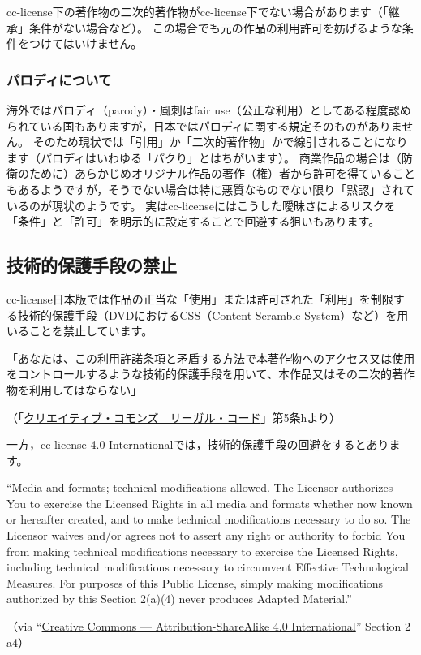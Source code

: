 \documentclass{ltjsarticle}
\renewcommand{\emph}[1]{\textsf{\textgt{#1}}} %
\begin{document}
cc-license下の著作物の二次的著作物がcc-license下でない場合があります（「継承」条件がない場合など）。
この場合でも元の作品の利用許可を妨げるような条件をつけてはいけません。

\subsubsection{パロディについて}

海外ではパロディ（parody）・風刺はfair use（公正な利用）としてある程度認められている国もありますが，日本ではパロディに関する規定そのものがありません。
そのため現状では「引用」か「二次的著作物」かで線引されることになります（パロディはいわゆる「パクり」とはちがいます）。
商業作品の場合は（防衛のために）あらかじめオリジナル作品の著作（権）者から許可を得ていることもあるようですが，そうでない場合は特に悪質なものでない限り「黙認」されているのが現状のようです。
実はcc-licenseにはこうした曖昧さによるリスクを「条件」と「許可」を明示的に設定することで回避する狙いもあります。


\subsection{技術的保護手段の禁止} \label{sec:drm}

cc-license日本版では作品の正当な「使用」または許可された「利用」を制限する技術的保護手段（DVDにおけるCSS（Content Scramble System）など）を用いることを禁止しています。
\begin{mdframed}
「あなたは、この利用許諾条項と矛盾する方法で本著作物へのアクセス又は使用をコントロールするような技術的保護手段を用いて、本作品又はその二次的著作物を利用してはならない」\par
（「\href{http://creativecommons.org/licenses/by-sa/2.1/jp/legalcode}{クリエイティブ・コモンズ　リーガル・コード}」第5条hより）
\end{mdframed}
一方，cc-license 4.0 Internationalでは，技術的保護手段の回避を\emph{許可}するとあります。
\begin{mdframed}
``Media and formats; technical modifications allowed. The Licensor authorizes You to exercise the Licensed Rights in all media and formats whether now known or hereafter created, and to make technical modifications necessary to do so. The Licensor waives and/or agrees not to assert any right or authority to forbid You from making technical modifications necessary to exercise the Licensed Rights, including technical modifications necessary to circumvent Effective Technological Measures. For purposes of this Public License, simply making modifications authorized by this Section 2(a)(4) never produces Adapted Material.'' \par
（via ``\href{http://creativecommons.org/licenses/by-sa/4.0/legalcode}{Creative Commons — Attribution-ShareAlike 4.0 International}'' Section 2 a4）
\end{mdframed}
\end{document}
